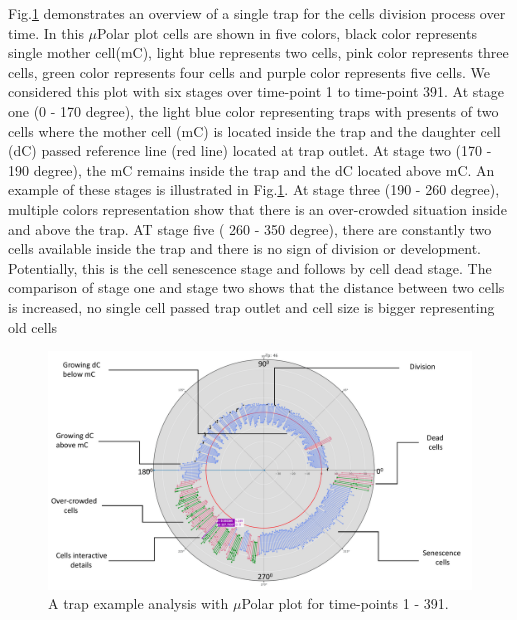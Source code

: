 \documentclass[conference]{IEEEtran}
\begin{document}
Fig.\ref{fig:explain} demonstrates an overview of a single trap for the cells division process over time. In this $\mu$Polar plot cells are shown in five colors, black color represents single mother cell(mC), light blue represents two cells, pink color represents three cells, green color represents four cells and purple color represents five cells. We considered this plot with six stages over time-point 1 to time-point 391. At stage one (0 - 170 degree), the light blue color representing traps with presents of two cells where the mother cell (mC) is located inside the trap and the daughter cell (dC) passed reference line (red line) located at trap outlet. At stage two (170 - 190 degree), the mC remains inside the trap and the dC located above mC.  An example of these stages is illustrated in Fig.\ref{fig:explain}. At stage three (190 - 260 degree), multiple colors representation show that there is an over-crowded situation inside and above the trap. AT stage five ( 260 - 350 degree), there are constantly two cells available inside the trap and there is no sign of division or development. Potentially, this is the cell senescence stage and follows by cell dead stage. The comparison of stage one and stage two shows that the distance between two cells is increased, no single cell passed trap outlet and cell size is bigger representing old cells    


\begin{figure}
\centering
\includegraphics[width=\textwidth,height=10 cm]{Patterns/explain.pdf}
\caption{A trap example analysis with $\mu$Polar plot for time-points 1 - 391.}
\label{fig:explain}
\end{figure}
\end{document}
